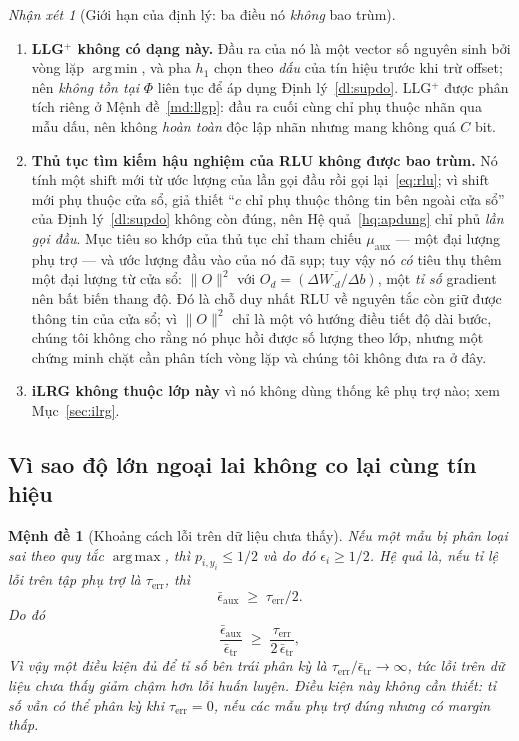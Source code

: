 \documentclass[11pt]{article}
\newtheorem{menhde}[dinhly]{Mệnh đề}
\theoremstyle{remark}
\newtheorem{nhanxet}[dinhly]{Nhận xét}
\DeclareMathOperator*{\argmaxop}{arg\,max}
\DeclareMathOperator*{\argminop}{arg\,min}
\begin{document}
\begin{nhanxet}[Giới hạn của định lý: ba điều nó \emph{không} bao trùm]
\label{nx:gioihan-dl3}
\begin{enumerate}
\item \textbf{LLG$^+$ không có dạng này.} Đầu ra của nó là một vector số
 nguyên sinh bởi vòng lặp $\argminop$, và pha $h_1$ chọn theo \emph{dấu} của
 tín hiệu trước khi trừ offset; nên \emph{không tồn tại} $\Phi$ liên tục để
 áp dụng Định lý~\ref{dl:supdo}. LLG$^+$ được phân tích riêng ở
 Mệnh đề~\ref{md:llgp}: đầu ra cuối cùng chỉ phụ thuộc nhãn qua mẫu dấu, nên
 không \emph{hoàn toàn} độc lập nhãn nhưng mang không quá $C$ bit.
\item \textbf{Thủ tục tìm kiếm hậu nghiệm của RLU không được bao trùm.} Nó
 tính một $\mathrm{shift}$ mới từ ước lượng của lần gọi đầu rồi gọi
 lại~\eqref{eq:rlu}; vì $\mathrm{shift}$ mới phụ thuộc cửa sổ, giả thiết ``$c$
 chỉ phụ thuộc thông tin bên ngoài cửa sổ'' của Định lý~\ref{dl:supdo} không
 còn đúng, nên Hệ quả~\ref{hq:apdung} chỉ phủ \emph{lần gọi đầu}. Mục tiêu
 so khớp của thủ tục chỉ tham chiếu $\mu_{\mathrm{aux}}$ --- một đại lượng
 phụ trợ --- và ước lượng đầu vào của nó đã sụp; tuy vậy nó \emph{có} tiêu
 thụ thêm một đại lượng từ cửa sổ:
 $\|O\|^2$ với $O_d = \overline{(\Delta W_{\cdot d}/\Delta b)}$, một
 \emph{tỉ số} gradient nên bất biến thang độ. Đó là chỗ duy nhất RLU về
 nguyên tắc còn giữ được thông tin của cửa sổ; vì $\|O\|^2$ chỉ là một vô
 hướng điều tiết độ dài bước, chúng tôi không cho rằng nó phục hồi được số
 lượng theo lớp, nhưng một chứng minh chặt cần phân tích vòng lặp và chúng
 tôi không đưa ra ở đây.
\item \textbf{iLRG không thuộc lớp này} vì nó không dùng thống kê phụ trợ
 nào; xem Mục~\ref{sec:ilrg}.
\end{enumerate}
\end{nhanxet}

\subsection{Vì sao độ lớn ngoại lai không co lại cùng tín hiệu}

\begin{menhde}[Khoảng cách lỗi trên dữ liệu chưa thấy]
\label{md:khoangcach}
Nếu một mẫu bị phân loại sai theo quy tắc $\argmaxop$, thì
$p_{i,y_i} \le 1/2$ và do đó $\epsilon_i \ge 1/2$. Hệ quả là, nếu tỉ lệ lỗi
trên tập phụ trợ là $\tau_{\mathrm{err}}$, thì
\[
 \bar\epsilon_{\mathrm{aux}} \;\ge\; \tau_{\mathrm{err}}/2 .
\]
Do đó
\begin{equation}
 \frac{\bar\epsilon_{\mathrm{aux}}}{\bar\epsilon_{\mathrm{tr}}}
 \;\ge\; \frac{\tau_{\mathrm{err}}}{2\,\bar\epsilon_{\mathrm{tr}}},
 \label{eq:tiso}
\end{equation}
Vì vậy một \emph{điều kiện đủ} để tỉ số bên trái phân kỳ là
$\tau_{\mathrm{err}}/\bar\epsilon_{\mathrm{tr}} \to \infty$, tức lỗi trên dữ
liệu chưa thấy giảm \emph{chậm hơn} lỗi huấn luyện. Điều kiện này \emph{không
cần thiết}: tỉ số vẫn có thể phân kỳ khi $\tau_{\mathrm{err}} = 0$, nếu các
mẫu phụ trợ đúng nhưng có margin thấp.
\end{menhde}
\end{document}
